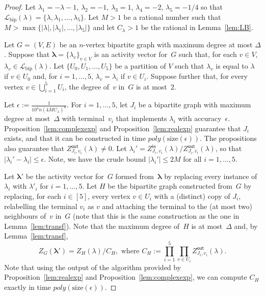 \documentclass[11pt]{article}
\def\Zin{Z^{\mathsf{in}}}
\def\Zout{Z^{\mathsf{out}}}
\newcommand{\size}[1]{\mathrm{size}(#1)}
\def\Lbip{\mathcal{L}_{\mathrm{bip}}}
\def\lambdab{\ensuremath{\boldsymbol{\lambda}}}
\newcommand{\eps}{\epsilon}
\begin{document}
\begin{proof}
Let $\lambda_1=-\lambda-1$, $\lambda_2=-1$, $\lambda_3=1$, $\lambda_4=-2$, $\lambda_5=-1/4$ so that $\Lbip(\lambda)=\{\lambda,\lambda_1,\hdots,\lambda_5\}$.
Let $M>1$ be a rational number such that $M>\max\{|\lambda|,|\lambda_1|, \hdots, |\lambda_5|\}$ and let $C_\lambda>1$ be the rational in Lemma~\ref{lem:LB}. 



Let $G=(V,E)$ be an $n$-vertex bipartite graph with maximum degree at
most $\Delta$. 
Suppose that $\lambdab=\{\lambda_v\}_{v\in V}$ is an activity vector for~$G$ such that,
for each $v\in V$, $\lambda_v \in \Lbip(\lambda)$. Let $\{U_0,U_1,\hdots,U_5\}$ be a partition of $V$
such that $\lambda_v$ is equal to $\lambda$ if $v\in U_0$ and, for $i=1,\hdots,5$, $\lambda_v=\lambda_i$ if $v\in U_i$. Suppose further that, for every vertex $v\in \bigcup^5_{i=1}U_i$,  the degree of~$v$ in~$G$  is at most~$2$.
 
Let $\epsilon:=\frac{1}{10^{4}n(4M C_\lambda)^{n}}$. For $i=1,\hdots,5$, let 
$J_i$ be a bipartite graph with maximum degree at most~$\Delta$ with terminal~$v_i$ 
that implements $\lambda_i$ with accuracy~$\epsilon$.
Proposition~\ref{lem:complexexp} and Proposition~\ref{lem:realexp} guarantee that $J_i$ exists, and
that it can be constructed in  time $poly(\size{\eps})$.
The propositions also guarantee that $\Zout_{J_i,v_i}(\lambda)\neq 0$.
Let $\lambda_i' = \Zin_{J_i,v_i}(\lambda)/\Zout_{J_i,v_i}(\lambda)$, so that  $|\lambda_i' - \lambda_i| \leq \epsilon$. Note, we have the crude bound $|\lambda_i'|\leq 2M$ for all $i=1,\hdots,5$.

Let $\lambdab'$ be the activity vector for~$G$ formed from~$\lambdab$ by replacing 
every instance of $\lambda_i$ with $\lambda'_i$ for $i=1,\hdots,5$. Let $H$ be the bipartite graph constructed from~$G$ by  
replacing, for each $i\in[5]$,
every vertex $v\in  U_i$   with
a (distinct) copy of $J_i$, relabelling the terminal $v_i$ as $v$  and attaching the terminal to the (at most two) neighbours of~$v$ in~$G$ (note that this is the same construction as the one in Lemma~\ref{lem:transf}). Note that the maximum degree of~$H$ is at most~$\Delta$ and, by Lemma~\ref{lem:transf},
\begin{equation}
\label{eq:GH}
Z_{G}(\lambdab') = Z_{H}(\lambda)/C_H, \mbox{ where } C_H:=\prod^5_{i=1} \prod_{v\in U_i} \Zout_{J_i,v_i}(\lambda).
\end{equation}
Note that using the output of the algorithm provided by Proposition~\ref{lem:realexp} and Proposition~\ref{lem:complexexp}, we can compute $C_H$ exactly
in time $poly(\size{\eps})$. 


\end{proof}
\end{document}
